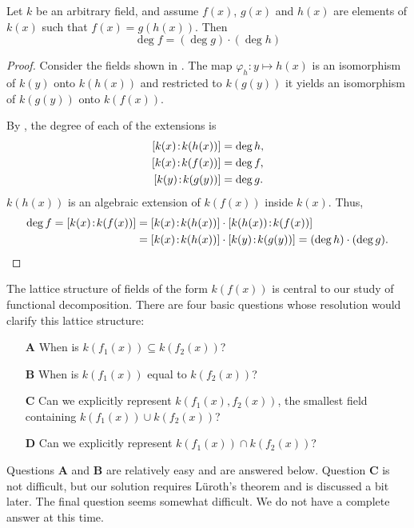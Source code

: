 \begin{proposition}
\label{RatDecomp:Bound:Prop}  Let $k$ be an arbitrary field, and 
assume $f(x)$, $g(x)$ and $h(x)$ are elements of $k(x)$ such that
$f(x) = g(h(x))$.  Then
\[
\deg f = (\deg g) \cdot (\deg h)
\]
\end{proposition}

\begin{proof}
Consider the fields shown in .  The map
$\varphi_h : y \mapsto h(x)$ is an isomorphism of $k(y)$ onto
$k(h(x))$ and restricted to $k(g(y))$ it yields an isomorphism of
$k(g(y))$ onto $k(f(x))$.

By , the degree of each of
the extensions is
\[
\begin{aligned}
\fieldDegree{k(x)}{k(h(x))} & = \deg h, \\
\fieldDegree{k(x)}{k(f(x))} & = \deg f, \\
\fieldDegree{k(y)}{k(g(y))} & = \deg g. 
\end{aligned}
\]
$k(h(x))$ is an algebraic extension of $k(f(x))$ inside $k(x)$.  Thus,
\[
\begin{aligned}
  \deg f = \fieldDegree{k(x)}{k(f(x))} & = \fieldDegree{k(x)}{k(h(x))}
      \cdot \fieldDegree{k(h(x))}{k(f(x))} \\
    & =\fieldDegree{k(x)}{k(h(x))} \cdot \fieldDegree{k(y)}{k(g(y))} 
      = (\deg h) \cdot (\deg g).
\end{aligned}
\]
\end{proof}

\medskip
The lattice structure of fields of the form $k(f(x))$ is central to
our study of functional decomposition.  There are four basic questions
whose resolution would clarify this lattice structure:
\begin{itemize}
\item[{\bf A}] When is $k(f_1(x)) \subseteq k(f_2(x))$?
\item[{\bf B}] When is $k(f_1(x))$ equal to $k(f_2(x))$?
\item[{\bf C}] Can we explicitly represent $k(f_1(x), f_2(x))$, the smallest
field containing $k(f_1(x)) \cup k(f_2(x))$?
\item[{\bf D}] Can we explicitly represent $k(f_1(x)) \cap k(f_2(x))$?
\end{itemize}
Questions {\bf A} and {\bf B} are relatively easy and are answered
below.  Question {\bf C} is not difficult, but our solution requires
L\"uroth's theorem and is discussed a bit later.  The final question
seems somewhat difficult.  We do not have a complete answer at this
time.

